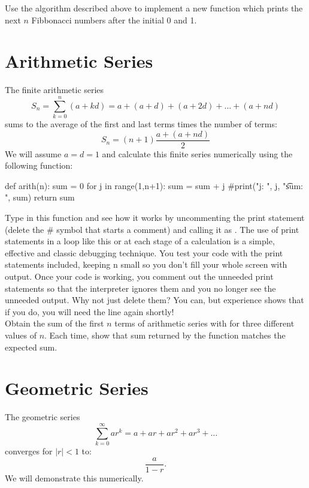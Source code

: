 \plot Use the algorithm described above to implement a new function
 which prints the next $n$ Fibbonacci numbers after the
initial 0 and 1.\\

\section{Arithmetic Series}

The finite arithmetic series
\begin{displaymath}
  S_n = \sum_{k=0}^{n} (a + kd) = a + (a+d) + (a+2d) + \ldots + (a+nd)
\end{displaymath}
sums to the average of the first and last terms times the number of terms:
\begin{equation} \label{eqn:arithsum}
S_n = (n+1)\frac{a + (a+nd)}{2}
\end{equation}
We will assume $a=d=1$ and calculate this finite series numerically using the following function:
\begin{python}
def arith(n):
    sum = 0
    for j in range(1,n+1):
        sum = sum + j
        #print("j: ", j, "\t sum: ", sum)
    return sum    
\end{python}
Type in this function and see how it works by uncommenting the print
statement (delete the \# symbol that starts a comment) and calling it
as .  The use of print statements in a loop like this
or at each stage of a calculation is a simple, effective and classic
debugging technique.  You test your code with the print statements
included, keeping n small so you don't fill your whole screen with
output. Once your code is working, you comment out the unneeded print
statements so that the interpreter ignores them and you no longer
see the unneeded output.  Why not just delete them?  You can, but
experience shows that if you do, you will need the line again shortly!\\

\plot Obtain the sum of the first $n$ terms of arithmetic series with
 for three different values of $n$.  Each time,
show that sum returned by the function matches the expected sum.

\section{Geometric Series}
\label{sec:geom}

The geometric series
\begin{displaymath}
  \sum_{k=0}^{\infty} a r^k = a + ar + ar^2 + ar^3 + \ldots
\end{displaymath}
converges for $|r| < 1$ to:
\begin{equation} \label{eqn:geomsum}
  \frac{a}{1-r}.
\end{equation}
We will demonstrate this numerically.\\

